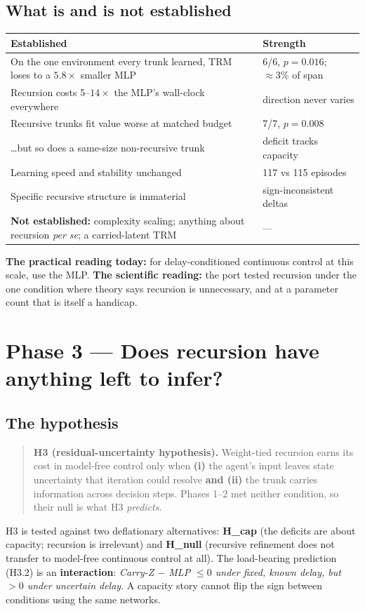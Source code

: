 \documentclass[11pt]{article}
\begin{document}
\subsection{What is and is not established}
\begin{table}[H]
\centering\small
\begin{tabularx}{\textwidth}{Yl}
\toprule
Established & Strength \\
\midrule
On the one environment every trunk learned, TRM loses to a $5.8\times$ smaller MLP & 6/6, $p=0.016$; ${\approx}3\%$ of span \\
Recursion costs 5--$14\times$ the MLP's wall-clock everywhere & direction never varies \\
Recursive trunks fit value worse at matched budget & 7/7, $p=0.008$ \\
\ldots but so does a same-size non-recursive trunk & deficit tracks capacity \\
Learning speed and stability unchanged & 117 vs 115 episodes \\
Specific recursive structure is immaterial & sign-inconsistent deltas \\
\textbf{Not established:} complexity scaling; anything about recursion \emph{per se}; a carried-latent TRM & --- \\
\bottomrule
\end{tabularx}
\end{table}
\textbf{The practical reading today:} for delay-conditioned continuous control at this scale, use the MLP. \textbf{The scientific reading:} the port tested recursion under the one condition where theory says recursion is unnecessary, and at a parameter count that is itself a handicap.

\section{Phase 3 --- Does recursion have anything left to infer?}

\subsection{The hypothesis}
\begin{quote}
\textbf{H3 (residual-uncertainty hypothesis).} Weight-tied recursion earns its cost in model-free control only when \textbf{(i)} the agent's input leaves state uncertainty that iteration could resolve \textbf{and (ii)} the trunk carries information across decision steps. Phases 1--2 met neither condition, so their null is what H3 \emph{predicts}.
\end{quote}
H3 is tested against two deflationary alternatives: \textbf{H\_cap} (the deficits are about capacity; recursion is irrelevant) and \textbf{H\_null} (recursive refinement does not transfer to model-free continuous control at all). The load-bearing prediction (H3.2) is an \textbf{interaction}: \emph{Carry-Z $-$ MLP $\le 0$ under fixed, known delay, but $>0$ under uncertain delay}. A capacity story cannot flip the sign between conditions using the same networks.
\end{document}
